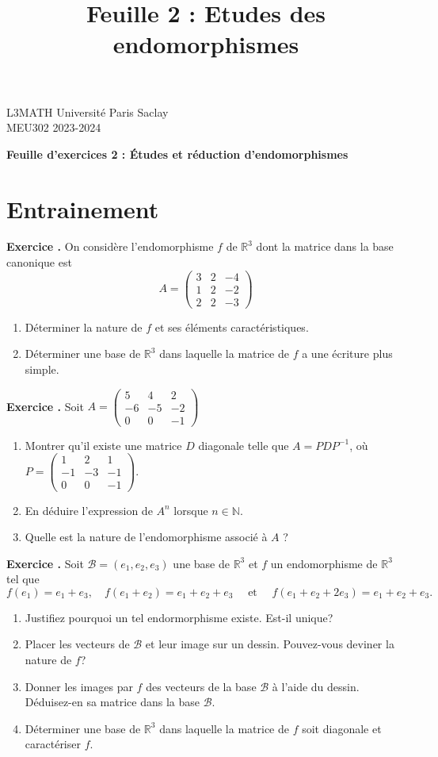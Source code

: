 \documentclass[10pt,a4paper]{article}
\title{Feuille 2 : Etudes des endomorphismes}
\def\bf#1{\textbf{#1}}
\newcounter{nexo}
\newcommand{\exo}{\medskip\noindent \bf{ Exercice \thenexo. \stepcounter{nexo}}}
\def\be{\begin{enumerate}}
\def\ee{\end{enumerate}}
\def\N{\mathbb{N}}
\def\R{\mathbb{R}}
\def\mat#1{\begin{pmatrix}#1\end{pmatrix}}
\begin{document}
\noindent L3MATH \hfill Universit\'e Paris Saclay\\
MEU302  \hfill  2023-2024\\

\begin{center}
\bf{Feuille d'exercices 2 : \'Etudes et réduction d'endomorphismes}
\end{center}
\vspace{0.2cm}


\section{Entrainement}

\exo On considère l'endomorphisme $f$ de $\R^3$ dont la matrice dans la base canonique est 
%
\begin{equation*}
 A=
 \begin{pmatrix}
    3 & 2 & -4 \\ 
    1 & 2 & -2 \\ 
    2 & 2 & -3
 \end{pmatrix}
\end{equation*}
%
\be
\item Déterminer la nature de $f$ et ses éléments caractéristiques.  
\item Déterminer une base de $\R^{3}$ dans laquelle la matrice de $f$ a une écriture plus simple.
\ee

\exo
Soit $A= \mat{5&4&2\\-6&-5&-2\\0&0&-1}$
\be
\item
Montrer qu'il existe une matrice $D$ diagonale telle que $A=PDP^{-1}$, où $P=\mat{ 1&2&1\\-1&-3&-1\\0&0&-1}$.
\item En déduire l'expression de $A^n$ lorsque $n\in \N$.
\item Quelle est la nature de l'endomorphisme associé à $A$ ?
\ee

\exo
Soit $\mathcal{B}=(e_1,e_2,e_3)$ une base de $\R^{3}$ et $f$ un endomorphisme de $\R^3$ tel que 
%
\begin{equation*}
 f(e_1) = e_1+e_3, \quad 
 f(e_1+e_2) = e_1+e_2+e_3 \quad 
 \mbox{ et } \quad 
 f(e_1+e_2+2 e_3) = e_1+e_2+e_3.
\end{equation*}
%
\be
\item Justifiez pourquoi un tel endormorphisme existe. Est-il unique?
\item Placer les vecteurs de $\mathcal{B}$  et leur image sur un dessin. Pouvez-vous deviner la nature de $f$?
\item Donner les images par $f$ des vecteurs de la base $\mathcal{B}$ à l'aide du dessin. Déduisez-en sa matrice dans la base $\mathcal{B}$.
\item Déterminer une base de $\R^{3}$ dans laquelle la matrice de $f$ soit diagonale et caractériser $f$.
\ee
\end{document}
